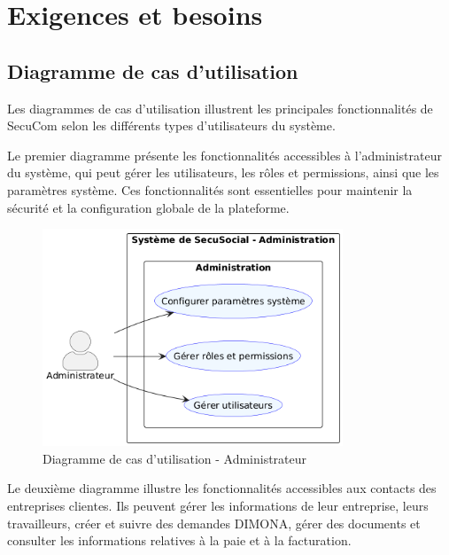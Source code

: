 \documentclass[12pt,a4paper]{report}
\begin{document}
\chapter{Exigences et besoins}

\section{Diagramme de cas d'utilisation}

Les diagrammes de cas d'utilisation illustrent les principales fonctionnalités de SecuCom selon les différents types d'utilisateurs du système.

Le premier diagramme présente les fonctionnalités accessibles à l'administrateur du système, qui peut gérer les utilisateurs, les rôles et permissions, ainsi que les paramètres système. Ces fonctionnalités sont essentielles pour maintenir la sécurité et la configuration globale de la plateforme.

\begin{figure}[h]
\centering
\includegraphics[width=0.8\textwidth]{AdminUC.png}
\caption{Diagramme de cas d'utilisation - Administrateur}
\end{figure}

Le deuxième diagramme illustre les fonctionnalités accessibles aux contacts des entreprises clientes. Ils peuvent gérer les informations de leur entreprise, leurs travailleurs, créer et suivre des demandes DIMONA, gérer des documents et consulter les informations relatives à la paie et à la facturation.
\end{document}
